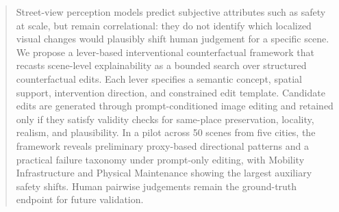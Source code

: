 \begin{abstract}
    Street-view perception models predict subjective attributes such as safety at scale, but remain correlational: they do not identify which localized visual changes would plausibly shift human judgement for a specific scene. We propose a lever-based interventional counterfactual framework that recasts scene-level explainability as a bounded search over structured counterfactual edits. Each lever specifies a semantic concept, spatial support, intervention direction, and constrained edit template. Candidate edits are generated through prompt-conditioned image editing and retained only if they satisfy validity checks for same-place preservation, locality, realism, and plausibility. In a pilot across 50 scenes from five cities, the framework reveals preliminary proxy-based directional patterns and a practical failure taxonomy under prompt-only editing, with Mobility Infrastructure and Physical Maintenance showing the largest auxiliary safety shifts. Human pairwise judgements remain the ground-truth endpoint for future validation.
\end{abstract}
